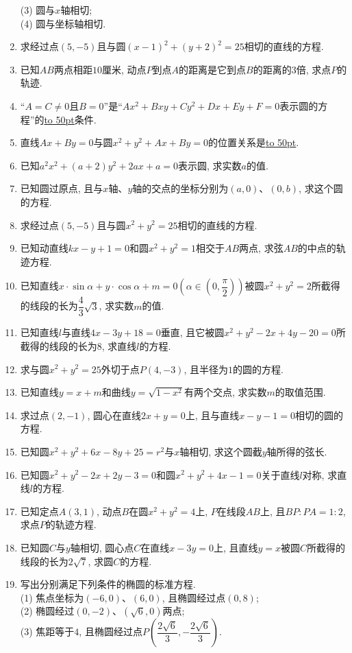 \documentclass[10pt,a4paper]{article}
\newcommand{\blank}[1]{\underline{\hbox to #1pt{}}}
\begin{document}
\begin{enumerate}[1.]
(3) 圆与$x$轴相切;\\
(4) 圆与坐标轴相切.
\item 求经过点$(5,-5)$且与圆$(x-1)^2+(y+2)^2=25$相切的直线的方程.
\item 已知$AB$两点相距$10$厘米, 动点$P$到点$A$的距离是它到点$B$的距离的$3$倍, 求点$P$的轨迹.
\item ``$A=C\ne 0$且$B=0$''是``$Ax^2+Bxy+Cy^2+Dx+Ey+F=0$表示圆的方程''的\blank{50}条件.
\item 直线$Ax+By=0$与圆$x^2+y^2+Ax+By=0$的位置关系是\blank{50}.
\item 已知$a^2x^2+(a+2)y^2+2ax+a=0$表示圆, 求实数$a$的值.
\item 已知圆过原点, 且与$x$轴、$y$轴的交点的坐标分别为$(a,0)$、$(0,b)$, 求这个圆的方程.
\item 求经过点$(5,-5)$且与圆$x^2+y^2=25$相切的直线的方程.
\item 已知动直线$kx-y+1=0$和圆$x^2+y^2=1$相交于$AB$两点, 求弦$AB$的中点的轨迹方程.
\item 已知直线$x\cdot \sin \alpha +y\cdot \cos \alpha +m=0(\alpha \in (0,\dfrac{\pi }2))$被圆$x^2+y^2=2$所截得的线段的长为$\dfrac 43\sqrt 3$, 求实数$m$的值.
\item 已知直线$l$与直线$4x-3y+18=0$垂直, 且它被圆$x^2+y^2-2x+4y-20=0$所截得的线段的长为$8$, 求直线$l$的方程.
\item 求与圆$x^2+y^2=25$外切于点$P(4,-3)$, 且半径为$1$的圆的方程.
\item 已知直线$y=x+m$和曲线$y=\sqrt {1-x^2}$有两个交点, 求实数$m$的取值范围.
\item 求过点$(2,-1)$, 圆心在直线$2x+y=0$上, 且与直线$x-y-1=0$相切的圆的方程.
\item 已知圆$x^2+y^2+6x-8y+25=r^2$与$x$轴相切, 求这个圆截$y$轴所得的弦长.
\item 已知圆$x^2+y^2-2x+2y-3=0$和圆$x^2+y^2+4x-1=0$关于直线$l$对称, 求直线$l$的方程.
\item 已知定点$A(3,1)$, 动点$B$在圆$x^2+y^2=4$上, $P$在线段$AB$上, 且$BP:PA=1:2$, 求点$P$的轨迹方程.
\item 已知圆$C$与$y$轴相切, 圆心点$C$在直线$x-3y=0$上, 且直线$y=x$被圆$C$所截得的线段的长为$2\sqrt 7$, 求圆$C$的方程.
\item 写出分别满足下列条件的椭圆的标准方程.\\
(1) 焦点坐标为$(-6,0)$、$(6,0)$, 且椭圆经过点$(0,8)$;\\
(2) 椭圆经过$(0,-2)$、$(\sqrt 6,0)$两点;\\
(3) 焦距等于$4$, 且椭圆经过点$P(\dfrac{2\sqrt 6}3,-\dfrac{2\sqrt 6}3)$.

\end{enumerate}
\end{document}
